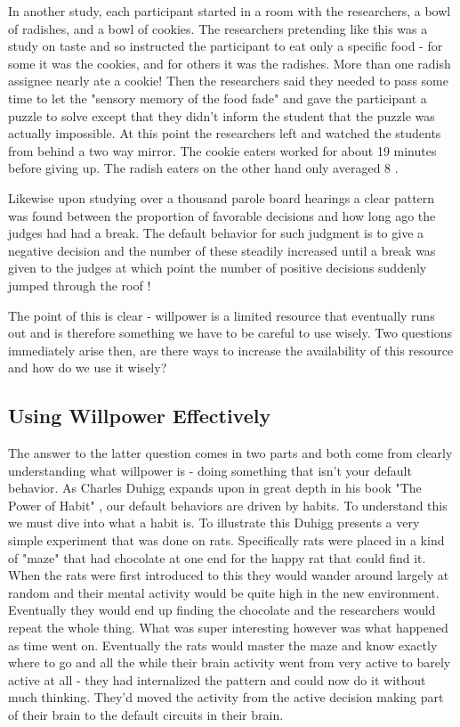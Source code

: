 \documentclass[11pt,a5paper]{book}
\begin{document}
In another study, each participant started in a room with the researchers, a bowl of radishes, and a bowl of cookies. The researchers pretending like this was a study on taste and so instructed the participant to eat only a specific food - for some it was the cookies, and for others it was the radishes. More than one radish assignee nearly ate a cookie! Then the researchers said they needed to pass some time to let the "sensory memory of the food fade" and gave the participant a puzzle to solve except that they didn't inform the student that the puzzle was actually impossible. At this point the researchers left and watched the students from behind a two way mirror. The cookie eaters worked for about 19 minutes before giving up. The radish eaters on the other hand only averaged 8 \cite{duhigg}.
\newline

Likewise upon studying over a thousand parole board hearings a clear pattern was found between the proportion of favorable decisions and how long ago the judges had had a break. The default behavior for such judgment is to give a negative decision and the number of these steadily increased until a break was given to the judges at which point the number of positive decisions suddenly jumped through the roof \cite{keller}! 
\newline 

The point of this is clear - willpower is a limited resource that eventually runs out and is therefore something we have to be careful to use wisely. Two questions immediately arise then, are there ways to increase the availability of this resource and how do we use it wisely?

\subsection{Using Willpower Effectively}
The answer to the latter question comes in two parts and both come from clearly understanding what willpower is - doing something that isn't your default behavior. As Charles Duhigg expands upon in great depth in his book "The Power of Habit" \cite{duhigg}, our default behaviors are driven by habits. To understand this we must dive into what a habit is. To illustrate this Duhigg presents a very simple experiment that was done on rats. Specifically rats were placed in a kind of "maze" that had chocolate at one end for the happy rat that could find it. When the rats were first introduced to this they would wander around largely at random and their mental activity would be quite high in the new environment. Eventually they would end up finding the chocolate and the researchers would repeat the whole thing. What was super interesting however was what happened as time went on. Eventually the rats would master the maze and know exactly where to go and all the while their brain activity went from very active to barely active at all - they had internalized the pattern and could now do it without much thinking. They'd moved the activity from the active decision making part of their brain to the default circuits in their brain. 
\newline
\end{document}
